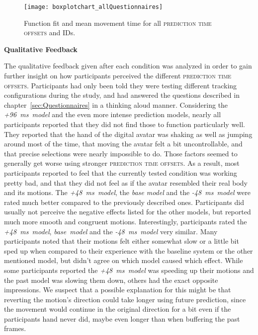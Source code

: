 \documentclass[sigconf]{acmart}
\begin{document}
\begin{figure}
  \centering
  \texttt{[image: boxplotchart\_allQuestionnaires]}
  \caption{Function fit and mean movement time for all \textsc{prediction time offsets} and IDs.}
\end{figure}


\textbf{Qualitative Feedback}

The qualitative feedback given after each condition was analyzed in order to gain further insight on how participants perceived the different \textsc{prediction time offsets}. Participants had only been told they were testing different tracking configurations during the study, and had answered the questions described in chapter~\ref{sec:Questionnaires} in a thinking aloud manner. Considering the \mbox{\textit{+96 ms model}} and the even more intense prediction models, nearly all participants reported that they did not find those to function particularly well. They reported that the hand of the digital avatar was shaking as well as jumping around most of the time, that moving the avatar felt a bit uncontrollable, and that precise selections were nearly impossible to do. Those factors seemed to generally get worse using stronger \textsc{prediction time offsets}. As a result, most participants reported to feel that the currently tested condition was working pretty bad, and that they did not feel as if the avatar resembled their real body and its motions. 
The \mbox{\textit{+48 ms model}}, the \textit{base model} and the \mbox{\textit{-48 ms model}} were rated much better compared to the previously described ones. Participants did usually not perceive the negative effects listed for the other models, but reported much more smooth and congruent motions. Interestingly, participants rated the \mbox{\textit{+48 ms model}}, \mbox{\textit{base model}} and the \mbox{\textit{-48 ms model}} very similar. Many participants noted that their motions felt either somewhat slow or a little bit sped up when compared to their experience with the baseline system or the other mentioned model, but didn't agree on which model caused which effect. While some participants reported the \mbox{\textit{+48 ms model}} was speeding up their motions and the past model was slowing them down, others had the exact opposite impressions. We suspect that a possible explanation for this might be that reverting the motion's direction could take longer using future prediction, since the movement would continue in the original direction for a bit even if the participants hand never did, maybe even longer than when buffering the past frames. 
\end{document}

